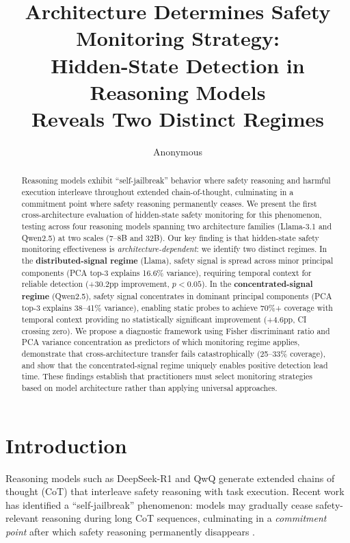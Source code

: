 \documentclass[11pt]{article}
\title{Architecture Determines Safety Monitoring Strategy:\\Hidden-State Detection in Reasoning Models\\Reveals Two Distinct Regimes}
\author{Anonymous}
\date{}
\begin{document}
\maketitle

\begin{abstract}
Reasoning models exhibit ``self-jailbreak'' behavior where safety reasoning and harmful execution interleave throughout extended chain-of-thought, culminating in a commitment point where safety reasoning permanently ceases.
We present the first cross-architecture evaluation of hidden-state safety monitoring for this phenomenon, testing across four reasoning models spanning two architecture families (Llama-3.1 and Qwen2.5) at two scales (7--8B and 32B).
Our key finding is that hidden-state safety monitoring effectiveness is \emph{architecture-dependent}: we identify two distinct regimes.
In the \textbf{distributed-signal regime} (Llama), safety signal is spread across minor principal components (PCA top-3 explains 16.6\% variance), requiring temporal context for reliable detection (+30.2pp improvement, $p<0.05$).
In the \textbf{concentrated-signal regime} (Qwen2.5), safety signal concentrates in dominant principal components (PCA top-3 explains 38--41\% variance), enabling static probes to achieve 70\%+ coverage with temporal context providing no statistically significant improvement (+4.6pp, CI crossing zero).
We propose a diagnostic framework using Fisher discriminant ratio and PCA variance concentration as predictors of which monitoring regime applies, demonstrate that cross-architecture transfer fails catastrophically (25--33\% coverage), and show that the concentrated-signal regime uniquely enables positive detection lead time.
These findings establish that practitioners must select monitoring strategies based on model architecture rather than applying universal approaches.
\end{abstract}

\section{Introduction}

Reasoning models such as DeepSeek-R1 and QwQ generate extended chains of thought (CoT) that interleave safety reasoning with task execution. Recent work has identified a ``self-jailbreak'' phenomenon: models may gradually cease safety-relevant reasoning during long CoT sequences, culminating in a \emph{commitment point} after which safety reasoning permanently disappears \cite{harmthoughts,selfjailbreak}.
\end{document}
